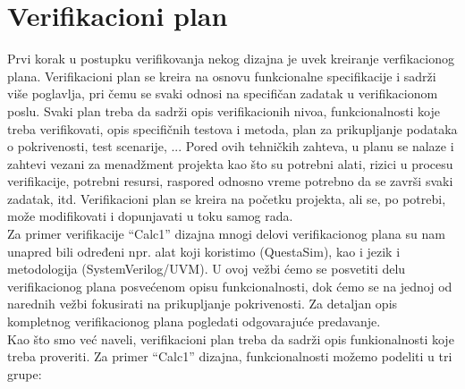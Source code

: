 


\section{Verifikacioni plan}

Prvi korak u postupku verifikovanja nekog dizajna je uvek kreiranje
verfikacionog plana. Verifikacioni plan se kreira na osnovu funkcionalne
specifikacije i sadrži više poglavlja, pri čemu se svaki odnosi na specifičan
zadatak u verifikacionom poslu. Svaki plan treba da sadrži opis verifikacionih
nivoa, funkcionalnosti koje treba verifikovati, opis specifičnih testova i
metoda, plan za prikupljanje podataka o pokrivenosti, test scenarije, ... Pored
ovih tehničkih zahteva, u planu se nalaze i zahtevi vezani za menadžment
projekta kao što su potrebni alati, rizici u procesu verifikacije, potrebni
resursi, raspored odnosno vreme potrebno da se završi svaki zadatak, itd.
Verifikacioni plan se kreira na početku projekta, ali se, po potrebi, može
modifikovati i dopunjavati u toku samog rada.\\

Za primer verifikacije ``Calc1'' dizajna mnogi delovi verifikacionog plana su
nam unapred bili određeni npr. alat koji koristimo (QuestaSim), kao i jezik i
metodologija (SystemVerilog/UVM). U ovoj vežbi ćemo se posvetiti delu
verifikacionog plana posvećenom opisu funkcionalnosti, dok ćemo se na jednoj od
narednih vežbi fokusirati na prikupljanje pokrivenosti. Za detaljan opis
kompletnog verifikacionog plana pogledati odgovarajuće predavanje.\\

Kao što smo već naveli, verifikacioni plan treba da sadrži opis funkionalnosti
koje treba proveriti. Za primer ``Calc1'' dizajna, funkcionalnosti možemo
podeliti u tri grupe:


